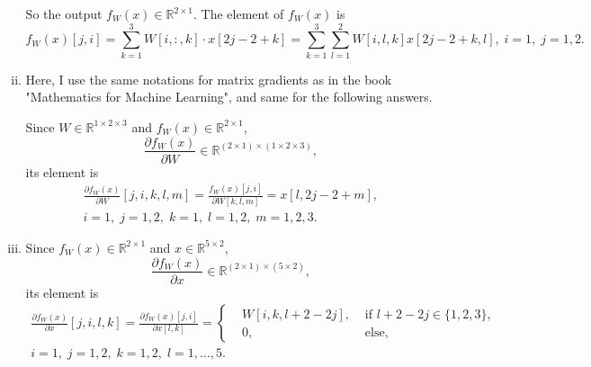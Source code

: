 \documentclass[10pt,a4paper]{article}
\theoremstyle{dotlessP}
\def\RR{\mathbb{R}}
\begin{document}
\begin{enumerate}[(a)]
\begin{enumerate}[(i)]
		So the output $f_W(x)\in\RR^{2\times 1}$. The element of $f_W(x)$ is 
		\begin{equation}
		f_W(x)[j,i] = \sum_{k=1}^{3} W[i,:,k] \cdot x[2j-2+k]=\sum_{k=1}^{3} \sum_{l=1}^2W[i,l,k] x[2j-2+k,l],\;i=1,\; j=1,2.
		\end{equation}
	
		
		
		\item Here, I use the same notations for matrix gradients as in the book "Mathematics for Machine Learning", and same for the following answers.
		
		Since $W\in\RR^{1\times 2\times 3}$ and $f_W(x)\in\RR^{2\times 1}$,
		\begin{equation}
		\frac{\partial f_W(x)}{\partial W}\in \RR^{(2\times 1)\times (1\times 2\times 3)},
		\end{equation}
		its element is 
		\begin{equation}
		\begin{aligned}
		\frac{\partial f_W(x)}{\partial W}[j,i,k,l,m]=\frac{f_W(x)[j,i]}{\partial W[k,l,m]}
=  x[l,2j-2+m],\\
		 i=1,\; j=1,2,\; k=1,\; l=1,2,\;m=1,2,3.
		\end{aligned}
		\end{equation}
		
		\item Since $f_W(x)\in\RR^{2\times 1}$ and $x\in\RR^{5\times 2}$, 
		\begin{equation}
		\frac{\partial f_W(x)}{\partial x}\in\RR^{(2\times 1) \times (5\times 2) },
		\end{equation}
		its element is 
		\begin{equation*}
		\begin{aligned}
		\frac{\partial f_W(x)}{\partial x}[j,i,l,k]=\frac{\partial f_W(x)[j,i]}{\partial x[l,k]}=\left\lbrace 
		\begin{aligned}
	&	W[i,k,l+2-2j], & \text{ if } l+2-2j\in\{1,2,3\},\\
	&	0, & \text{ else,}
		\end{aligned}
		\right. \\i=1,\; j=1,2, \; k=1,2, \; l=1,\ldots, 5.
		\end{aligned}
		\end{equation*}
		

\end{enumerate}
\end{enumerate}
\end{document}
